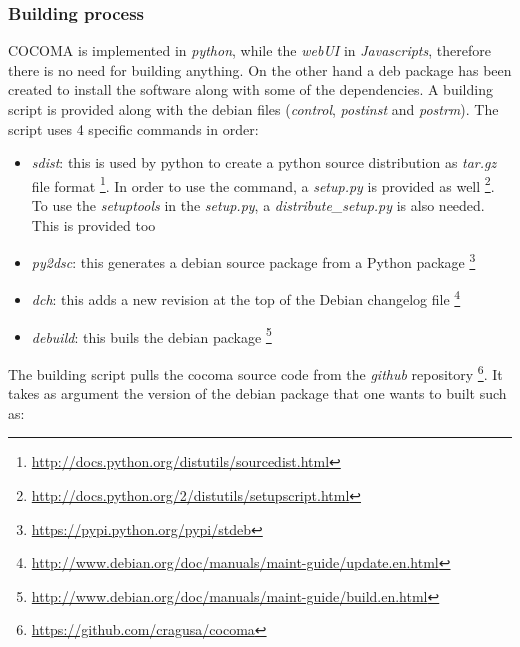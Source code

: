 \documentclass[letterpaper,10pt,english]{sphinxhowto}
\begin{document}
\subsubsection{Building process}
\label{COCOMA/10_implementation_details:building-process}
COCOMA is implemented in \emph{python}, while the \emph{webUI} in \emph{Javascripts}, therefore there is no need for building anything. On the other hand a deb package has been created to install the software along with some of the dependencies. A building script is provided along with the debian files (\emph{control}, \emph{postinst} and \emph{postrm}). The script uses 4 specific commands in order:
\begin{itemize}
\item {} 
\emph{sdist}: this is used by python  to create a python source distribution as \emph{tar.gz} file format \footnote{
\href{http://docs.python.org/distutils/sourcedist.html}{http://docs.python.org/distutils/sourcedist.html}
}. In order to use the command, a \emph{setup.py} is provided as well \footnote{
\href{http://docs.python.org/2/distutils/setupscript.html}{http://docs.python.org/2/distutils/setupscript.html}
}. To use the \emph{setuptools} in the \emph{setup.py}, a \emph{distribute\_setup.py} is also needed. This is provided too

\item {} 
\emph{py2dsc}: this generates a debian source package from a Python package \footnote{
\href{https://pypi.python.org/pypi/stdeb}{https://pypi.python.org/pypi/stdeb}
}

\item {} 
\emph{dch}: this adds a new revision at the top of the Debian changelog file \footnote{
\href{http://www.debian.org/doc/manuals/maint-guide/update.en.html}{http://www.debian.org/doc/manuals/maint-guide/update.en.html}
}

\item {} 
\emph{debuild}: this buils the debian package \footnote{
\href{http://www.debian.org/doc/manuals/maint-guide/build.en.html}{http://www.debian.org/doc/manuals/maint-guide/build.en.html}
}

\end{itemize}

The building script pulls the cocoma source code from the \emph{github} repository \footnote{
\href{https://github.com/cragusa/cocoma}{https://github.com/cragusa/cocoma}
}. It takes as argument the version of the debian package that one wants to built such as:
\end{document}
